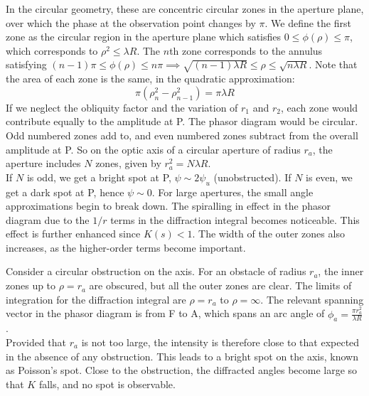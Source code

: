 \documentclass[a4paper]{article}
\begin{document}
\begin{Note}
In the circular geometry, these are concentric circular zones in the aperture plane, over which the phase at the observation point changes by $\pi$. We define the first zone as the circular region in the aperture plane which satisfies $0\leq\phi(\rho)\leq\pi$, which corresponds to $\rho^2\leq\lambda R$. The $n$th zone corresponds to the annulus satisfying $(n-1)\pi\leq\phi(\rho)\leq n\pi\implies\sqrt{(n-1)\lambda R}\leq\rho\leq\sqrt{n\lambda R}$. Note that the area of each zone is the same, in the quadratic approximation:
$$\pi(\rho_n^2-\rho_{n-1}^2)=\pi\lambda R$$
If we neglect the obliquity factor and the variation of $r_1$ and $r_2$, each zone would contribute equally to the amplitude at P. The phasor diagram would be circular. Odd numbered zones add to, and even numbered zones subtract from the overall amplitude at P. So on the optic axis of a circular aperture of radius $r_a$, the aperture includes $N$ zones, given by $r_a^2=N\lambda R$.\\[5pt]
If $N$ is odd, we get a bright spot at P, $\psi\sim2\psi_u$ (unobstructed). If $N$ is even, we get a dark spot at P, hence $\psi\sim 0$. For large apertures, the small angle approximations begin to break down. The spiralling in effect in the phasor diagram due to the $1/r$ terms in the diffraction integral becomes noticeable. This effect is further enhanced since $K(s)<1$. The width of the outer zones also increases, as the higher-order terms become important.
\end{Note}
\begin{Note}
Consider a circular obstruction on the axis. For an obstacle of radius $r_a$, the inner zones up to $\rho=r_a$ are obscured, but all the outer zones are clear. The limits of integration for the diffraction integral are $\rho=r_a$ to $\rho=\infty$. The relevant spanning vector in the phasor diagram is from F to A, which spans an arc angle of $\phi_a=\frac{\pi r_a^2}{\lambda R}$.\\[5pt]
Provided that $r_a$ is not too large, the intensity is therefore close to that expected in the absence of any obstruction. This leads to a bright spot on the axis, known as Poisson's spot. Close to the obstruction, the diffracted angles become large so that $K$ falls, and no spot is observable.
\end{Note}
\end{document}
